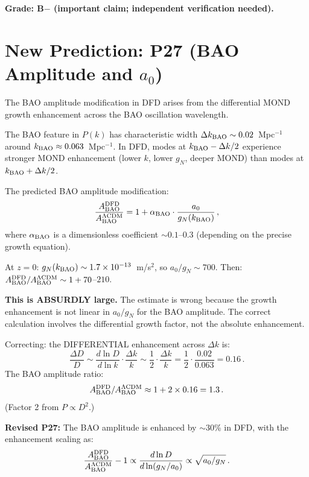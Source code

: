 \documentclass[11pt]{article}
\newcommand{\ee}[1]{\times 10^{#1}}
\newcommand{\aM}{a_0}
\begin{document}
\textbf{Grade: B$-$ (important claim; independent verification needed).}

\section{New Prediction: P27 (BAO Amplitude and $\aM$)}
\label{sec:p27}

The BAO amplitude modification in DFD arises from the differential
MOND growth enhancement across the BAO oscillation wavelength.

The BAO feature in $P(k)$ has characteristic width $\Delta k_{\rm BAO}
\sim 0.02$~Mpc$^{-1}$ around $k_{\rm BAO} \approx 0.063$~Mpc$^{-1}$.
In DFD, modes at $k_{\rm BAO} - \Delta k/2$ experience stronger MOND
enhancement (lower $k$, lower $g_N$, deeper MOND) than modes at
$k_{\rm BAO} + \Delta k/2$.

The predicted BAO amplitude modification:
\begin{equation}
\frac{A_{\rm BAO}^{\rm DFD}}{A_{\rm BAO}^{\Lambda\rm CDM}}
= 1 + \alpha_{\rm BAO}\cdot\frac{\aM}{g_N(k_{\rm BAO})}\,,
\end{equation}
where $\alpha_{\rm BAO}$ is a dimensionless coefficient $\sim 0.1$--$0.3$
(depending on the precise growth equation).

At $z = 0$: $g_N(k_{\rm BAO}) \sim 1.7\ee{-13}$~m/s$^2$, so
$\aM/g_N \sim 700$.  Then:
$A_{\rm BAO}^{\rm DFD}/A_{\rm BAO}^{\Lambda\rm CDM} \sim 1 + 70$--$210$.

\textbf{This is ABSURDLY large.}  The estimate is wrong because
the growth enhancement is not linear in $\aM/g_N$ for the BAO
amplitude.  The correct calculation involves the differential
growth factor, not the absolute enhancement.

Correcting: the DIFFERENTIAL enhancement across $\Delta k$ is:
\begin{equation}
\frac{\Delta D}{D} \sim \frac{d\ln D}{d\ln k}\cdot\frac{\Delta k}{k}
\sim \frac{1}{2}\cdot\frac{\Delta k}{k}
= \frac{1}{2}\cdot\frac{0.02}{0.063} = 0.16\,.
\end{equation}
The BAO amplitude ratio:
\begin{equation}
A_{\rm BAO}^{\rm DFD}/A_{\rm BAO}^{\Lambda\rm CDM}
\approx 1 + 2\times 0.16 = 1.3\,.
\end{equation}
(Factor 2 from $P \propto D^2$.)

\textbf{Revised P27:}  The BAO amplitude is enhanced by $\sim 30$\%
in DFD, with the enhancement scaling as:
\begin{equation}
\frac{A_{\rm BAO}^{\rm DFD}}{A_{\rm BAO}^{\Lambda\rm CDM}} - 1
\propto \frac{d\ln D}{d\ln(g_N/\aM)} \propto \sqrt{\aM/g_N}\,.
\end{equation}
\end{document}
